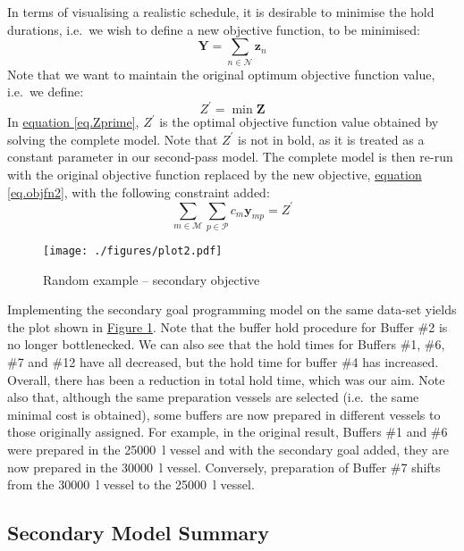 In terms of visualising a realistic schedule, it is desirable to minimise the
hold durations, i.e.\ we wish to define a new objective function, to be
minimised:
\begin{equation}
    \boldsymbol{Y} = \sum_{n \in \mathcal{N}} \boldsymbol{z}_{n}
    \label{eq.objfn2}
\end{equation}
Note that we want to maintain the original optimum objective function value,
i.e.\ we define:
\begin{equation}
    Z^{\prime} = \min \boldsymbol{Z}
    \label{eq.Zprime}
\end{equation}
In \hyperref[eq.Zprime]{equation \ref*{eq.Zprime}}, $Z^{\prime}$ is the optimal objective function value
obtained by solving the complete model.
Note that $Z^{\prime}$ is not in bold, as it is treated as a constant parameter
in our second-pass model.
The complete model is then re-run with the original objective function replaced
by the new objective, \hyperref[eq.objfn2]{equation \ref*{eq.objfn2}}, with the
following constraint added:
\begin{equation}
    \sum_{m \in \mathcal{M}} \sum_{p \in \mathcal{P}} c_m \boldsymbol{y}_{mp}
    = Z^{\prime}
    \label{eq.constr10}
\end{equation}
\begin{figure}
    \centering
    \texttt{[image: ./figures/plot2.pdf]}
    \caption{Random example -- secondary objective}
    \label{fig.secondary}
\end{figure}

Implementing the secondary goal programming model on the same data-set yields
the plot shown in \hyperref[fig.secondary]{Figure \ref*{fig.secondary}}.
Note that the buffer hold procedure for Buffer \#2 is no longer bottlenecked.
We can also see that the hold times for Buffers \#1, \#6, \#7 and \#12 have
all decreased, but the hold time for buffer \#4 has increased.
Overall, there has been a reduction in total hold time, which was our aim.
Note also that, although the same preparation vessels are selected (i.e.\ the
same minimal cost is obtained), some buffers are now prepared in different
vessels to those originally assigned.
For example, in the original result, Buffers \#1 and \#6 were prepared in the
\SI{25000}{\litre} vessel and with the secondary goal added, they are now
prepared in the \SI{30000}{\litre} vessel.
Conversely, preparation of Buffer \#7 shifts from the \SI{30000}{\litre} vessel
to the \SI{25000}{\litre} vessel.

\subsection{Secondary Model Summary}\label{SS.model2summary}

